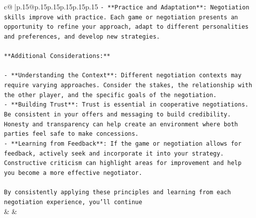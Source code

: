 \documentclass{article}
\begin{document}
{\begin{supertabular}{c@{$\;$}|p{.15\linewidth}@{}p{.15\linewidth}p{.15\linewidth}p{.15\linewidth}p{.15\linewidth}p{.15\linewidth}}
{{{\texttt{{-} **Practice and Adaptation**: Negotiation skills improve with practice. Each game or negotiation presents an opportunity to refine your approach, adapt to different personalities and preferences, and develop new strategies.} \\
\\ 
\texttt{**Additional Considerations:**} \\
\\ 
\texttt{{-} **Understanding the Context**: Different negotiation contexts may require varying approaches. Consider the stakes, the relationship with the other player, and the specific goals of the negotiation.} \\
\texttt{{-} **Building Trust**: Trust is essential in cooperative negotiations. Be consistent in your offers and messaging to build credibility. Honesty and transparency can help create an environment where both parties feel safe to make concessions.} \\
\texttt{{-} **Learning from Feedback**: If the game or negotiation allows for feedback, actively seek and incorporate it into your strategy. Constructive criticism can highlight areas for improvement and help you become a more effective negotiator.} \\
\\ 
\texttt{By consistently applying these principles and learning from each negotiation experience, you'll continue} \\
            }
        }
    }
    & & \\ \\


\end{supertabular}}
\end{document}
